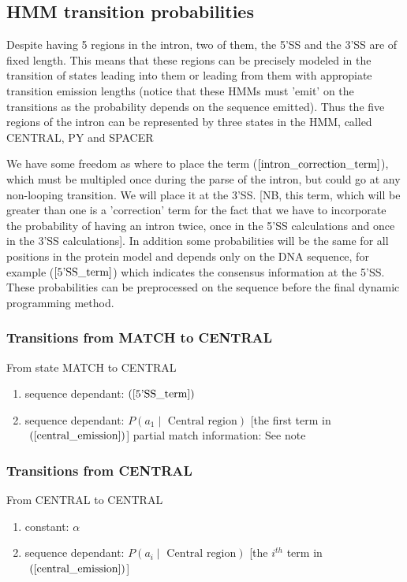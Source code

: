 \subsection{HMM transition probabilities}


Despite having 5 regions in the intron, two of them, the 5'SS and the
3'SS are of fixed length. This means that these regions can be precisely
modeled in the transition of states leading into them or leading from them
with appropiate transition emission lengths
(notice that these HMMs must 'emit' on the transitions as the probability
depends on the sequence emitted). Thus the five regions of the intron can
be represented by three states in the HMM, called CENTRAL, PY and SPACER

We have some freedom as where to place the term
($\ref{intron_correction_term}$), which must be multipled once during the
parse of the intron, but could go at any non-looping transition. We will
place it at the 3'SS. [NB, this term, which will be greater than one is a 'correction'
term for the fact that we have to incorporate the probability of having an intron
twice, once in the 5'SS calculations and once in the 3'SS calculations].
In addition some probabilities will be
the same for all positions in the protein model and depends only on
the DNA sequence, for example ($\ref{5'SS_term}$) which indicates the
consensus information at the 5'SS. These probabilities can be
preprocessed on the sequence before the final dynamic programming
method.


\subsubsection{Transitions from MATCH to CENTRAL}
From state MATCH to CENTRAL
\begin{enumerate}
\item sequence dependant: $(\ref{5'SS_term})$
\item sequence dependant: $P(a_1 \; | \; \mbox{ Central region})$ [the first term in$~(\ref{central_emission})$]
partial match information: See note
\end{enumerate}

\subsubsection{Transitions from CENTRAL}
From CENTRAL to CENTRAL
\begin{enumerate}
\item constant: $\alpha$
\item sequence dependant: $P(a_i \; | \; \mbox{ Central region})$ [the $i^{th}$ term in$~(\ref{central_emission})$]
\end{enumerate}

